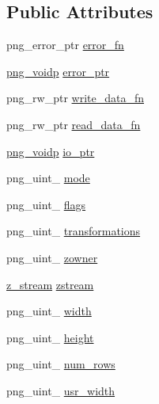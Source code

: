 \subsection*{Public Attributes}
\begin{DoxyCompactItemize}
\item 
png\+\_\+error\+\_\+ptr \mbox{\hyperlink{structpng__struct__def_a2cc5bd1cf507373992a61cf725a730cd}{error\+\_\+fn}}
\item 
\mbox{\hyperlink{pngconf_8h_a9dc088c359b6d7e45682af63a3361b58}{png\+\_\+voidp}} \mbox{\hyperlink{structpng__struct__def_a06837611b772a6a44cf6306ea08d40a8}{error\+\_\+ptr}}
\item 
png\+\_\+rw\+\_\+ptr \mbox{\hyperlink{structpng__struct__def_acc53cd87f0ffc4d1f67da7e10a94af39}{write\+\_\+data\+\_\+fn}}
\item 
png\+\_\+rw\+\_\+ptr \mbox{\hyperlink{structpng__struct__def_a83804076437d1587fab947c056bb56ae}{read\+\_\+data\+\_\+fn}}
\item 
\mbox{\hyperlink{pngconf_8h_a9dc088c359b6d7e45682af63a3361b58}{png\+\_\+voidp}} \mbox{\hyperlink{structpng__struct__def_a996f6f8aaa00ede3bb147714ee7c480e}{io\+\_\+ptr}}
\item 
png\+\_\+uint\+\_ \mbox{\hyperlink{structpng__struct__def_a6db33193ca2fdb01fa6d8da9756bd448}{mode}}
\item 
png\+\_\+uint\+\_ \mbox{\hyperlink{structpng__struct__def_aa7529cc3d13e759037c504fddd6e1ae8}{flags}}
\item 
png\+\_\+uint\+\_ \mbox{\hyperlink{structpng__struct__def_a4ab3e33248dd4c32880609a1a10fa725}{transformations}}
\item 
png\+\_\+uint\+\_ \mbox{\hyperlink{structpng__struct__def_a5bfc727f45873680edacf4d12bebc8f4}{zowner}}
\item 
\mbox{\hyperlink{zlib_8h_afa60092f4e0b9bc4f23b41c6930463f0}{z\+\_\+stream}} \mbox{\hyperlink{structpng__struct__def_aed56a6997ce7d1a90f0a143eb0964cd5}{zstream}}
\item 
png\+\_\+uint\+\_ \mbox{\hyperlink{structpng__struct__def_abb11531c781ea91b63d0fa1af122eaab}{width}}
\item 
png\+\_\+uint\+\_ \mbox{\hyperlink{structpng__struct__def_a1dd47d897b96de5b8c12a242695adad5}{height}}
\item 
png\+\_\+uint\+\_ \mbox{\hyperlink{structpng__struct__def_a209926649ef1f0bb46ea0f277041ce78}{num\+\_\+rows}}
\item 
png\+\_\+uint\+\_ \mbox{\hyperlink{structpng__struct__def_a6fb8c450c20bc0161211b00a18db173e}{usr\+\_\+width}}

\end{DoxyCompactItemize}
